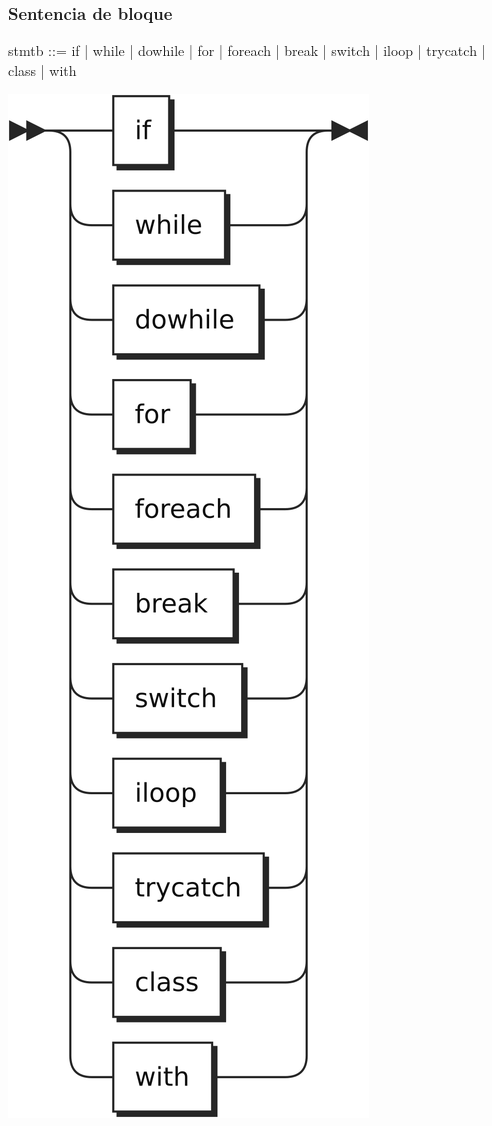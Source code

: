 \subsubsection{Sentencia de bloque}
\begin{multicols}{2}
\begin{myverbatim}
stmtb ::=   if
         |  while
         |  dowhile
         |  for
         |  foreach
         |  break
         |  switch
         |  iloop
         |  trycatch
         |  class
         |  with
\end{myverbatim}  	
\columnbreak
\begin{center}
\includegraphics[scale=0.7]{diagram/stmtb.png} \\
\end{center}
\end{multicols}
